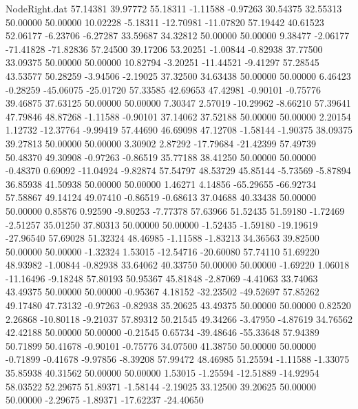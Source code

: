 \begin{filecontents}{NodeRight.dat}
  57.14381   39.97772   55.18311    -1.11588   -0.97263   30.54375   32.55313   50.00000   50.00000   10.02228   -5.18311  -12.70981  -11.07820
  57.19442   40.61523   52.06177    -6.23706   -6.27287   33.59687   34.32812   50.00000   50.00000    9.38477   -2.06177  -71.41828  -71.82836
  57.24500   39.17206   53.20251    -1.00844   -0.82938   37.77500   33.09375   50.00000   50.00000   10.82794   -3.20251  -11.44521   -9.41297
  57.28545   43.53577   50.28259    -3.94506   -2.19025   37.32500   34.63438   50.00000   50.00000    6.46423   -0.28259  -45.06075  -25.01720
  57.33585   42.69653   47.42981    -0.90101   -0.75776   39.46875   37.63125   50.00000   50.00000    7.30347    2.57019  -10.29962   -8.66210
  57.39641   47.79846   48.87268    -1.11588   -0.90101   37.14062   37.52188   50.00000   50.00000    2.20154    1.12732  -12.37764   -9.99419
  57.44690   46.69098   47.12708    -1.58144   -1.90375   38.09375   39.27813   50.00000   50.00000    3.30902    2.87292  -17.79684  -21.42399
  57.49739   50.48370   49.30908    -0.97263   -0.86519   35.77188   38.41250   50.00000   50.00000   -0.48370    0.69092  -11.04924   -9.82874
  57.54797   48.53729   45.85144    -5.73569   -5.87894   36.85938   41.50938   50.00000   50.00000    1.46271    4.14856  -65.29655  -66.92734
  57.58867   49.14124   49.07410    -0.86519   -0.68613   37.04688   40.33438   50.00000   50.00000    0.85876    0.92590   -9.80253   -7.77378
  57.63966   51.52435   51.59180    -1.72469   -2.51257   35.01250   37.80313   50.00000   50.00000   -1.52435   -1.59180  -19.19619  -27.96540
  57.69028   51.32324   48.46985    -1.11588   -1.83213   34.36563   39.82500   50.00000   50.00000   -1.32324    1.53015  -12.54716  -20.60080
  57.74110   51.69220   48.93982    -1.00844   -0.82938   33.64062   40.33750   50.00000   50.00000   -1.69220    1.06018  -11.16496   -9.18248
  57.80193   50.95367   45.81848    -2.87069   -4.41063   33.74063   43.49375   50.00000   50.00000   -0.95367    4.18152  -32.23502  -49.52697
  57.85262   49.17480   47.73132    -0.97263   -0.82938   35.20625   43.49375   50.00000   50.00000    0.82520    2.26868  -10.80118   -9.21037
  57.89312   50.21545   49.34266    -3.47950   -4.87619   34.76562   42.42188   50.00000   50.00000   -0.21545    0.65734  -39.48646  -55.33648
  57.94389   50.71899   50.41678    -0.90101   -0.75776   34.07500   41.38750   50.00000   50.00000   -0.71899   -0.41678   -9.97856   -8.39208
  57.99472   48.46985   51.25594    -1.11588   -1.33075   35.85938   40.31562   50.00000   50.00000    1.53015   -1.25594  -12.51889  -14.92954
  58.03522   52.29675   51.89371    -1.58144   -2.19025   33.12500   39.20625   50.00000   50.00000   -2.29675   -1.89371  -17.62237  -24.40650

\end{filecontents}
